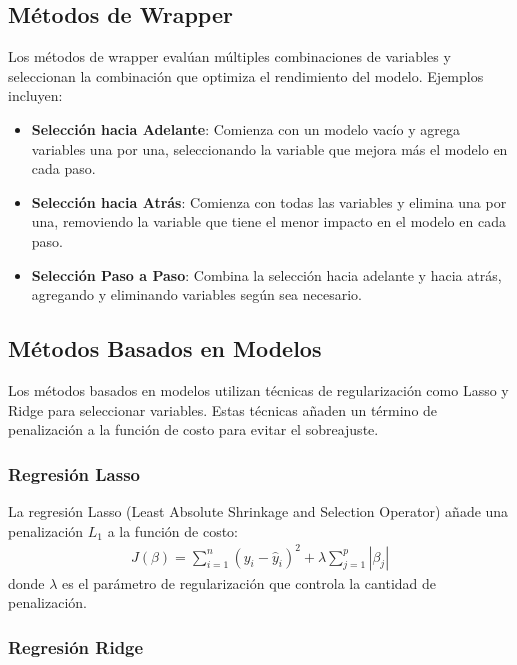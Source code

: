 \documentclass[a4paper]{report} %
\begin{document}
\subsection{M\'etodos de Wrapper}

Los m\'etodos de wrapper eval\'uan m\'ultiples combinaciones de variables y seleccionan la combinaci\'on que optimiza el rendimiento del modelo. Ejemplos incluyen:
\begin{itemize}
    \item \textbf{Selecci\'on hacia Adelante}: Comienza con un modelo vac\'io y agrega variables una por una, seleccionando la variable que mejora m\'as el modelo en cada paso.
    \item \textbf{Selecci\'on hacia Atr\'as}: Comienza con todas las variables y elimina una por una, removiendo la variable que tiene el menor impacto en el modelo en cada paso.
    \item \textbf{Selecci\'on Paso a Paso}: Combina la selecci\'on hacia adelante y hacia atr\'as, agregando y eliminando variables seg\'un sea necesario.
\end{itemize}

\subsection{M\'etodos Basados en Modelos}

Los m\'etodos basados en modelos utilizan t\'ecnicas de regularizaci\'on como Lasso y Ridge para seleccionar variables. Estas t\'ecnicas a\~naden un t\'ermino de penalizaci\'on a la funci\'on de costo para evitar el sobreajuste.

\subsubsection{Regresi\'on Lasso}

La regresi\'on Lasso (Least Absolute Shrinkage and Selection Operator) a\~nade una penalizaci\'on $L_1$ a la funci\'on de costo:
\begin{eqnarray*}
J(\beta) = \sum_{i=1}^{n} (y_i - \hat{y}_i)^2 + \lambda \sum_{j=1}^{p} |\beta_j|
\end{eqnarray*}
donde $\lambda$ es el par\'ametro de regularizaci\'on que controla la cantidad de penalizaci\'on.

\subsubsection{Regresi\'on Ridge}
\end{document}

